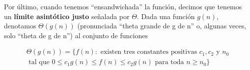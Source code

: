 \begin{definition}

Por \'ultimo, cuando tenemos ``ensandwichada'' la funci\'on, decimos que tenemos un \textbf{l\'imite asint\'otico justo} señalada por $\Theta$. Dada una funci\'on $g(n)$, denotamos $\Theta(g(n))$ (pronunciada ``theta grande de g de n'' o, algunas veces, solo ``theta de g de n'') al conjunto de funciones

\begin{equation*}
\begin{split}
\Theta(g(n)) = \{f(n): \text{ existen tres constantes positivas } c_1, c_2 \text{ y } n_0 \\
\text{ tal que } 0 \leq c_1g(n) \leq f(n) \leq c_2g(n) \text{ para toda } n \geq n_0\}
\end{split}
\end{equation*}
\end{definition}
